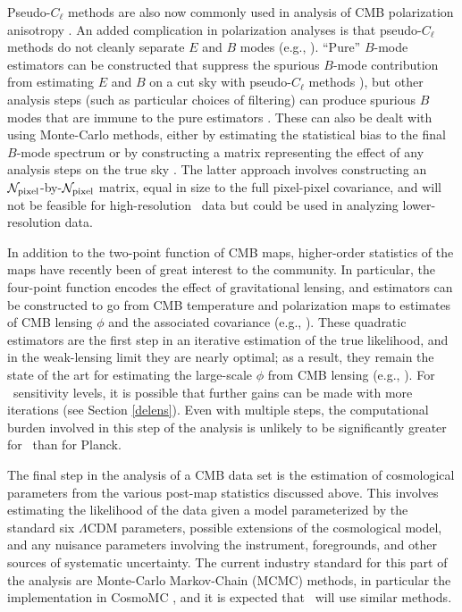 Pseudo-$C_\ell$ methods are also now commonly used in analysis of CMB polarization anisotropy
\cite{Aghanim:2015xee,Naess:2014wtr,Crites:2014prc}. An added complication in polarization analyses is that 
pseudo-$C_\ell$ methods do not cleanly separate $E$ and $B$ modes (e.g., \cite{Challinor:2005jy}).
``Pure'' $B$-mode estimators can be constructed that suppress the spurious $B$-mode contribution
from estimating $E$ and $B$ on a cut sky with pseudo-$C_\ell$ methods \cite{Smith:2005gi}), but 
other analysis steps (such as particular choices of filtering) can produce spurious $B$ modes that
are immune to the pure estimators \cite{Keisler:2015hfa}. These can also be dealt with using Monte-Carlo
methods, either by estimating the statistical bias to the final $B$-mode spectrum or by constructing
a matrix representing the effect of any analysis steps on the true sky \cite{Ade:2014xna}. The latter
approach involves constructing an ${\cal N}_\mathrm{pixel}$-by-${\cal N}_\mathrm{pixel}$ matrix, equal in size to the 
full pixel-pixel covariance, and will not be feasible for high-resolution \cmbexp\ data but could be 
used in analyzing lower-resolution data.

In addition to the two-point function of CMB maps, higher-order statistics of the maps have recently 
been of great interest to the community. In particular, the four-point function encodes the effect of 
gravitational lensing, and estimators can be constructed to go from CMB temperature and polarization
maps to estimates of CMB lensing $\phi$ and the associated covariance (e.g., \cite{Hu:2001kj,Okamoto:2003zw}).
These quadratic estimators are the first step in an iterative estimation of the true likelihood, and in
the weak-lensing limit they are nearly optimal; as a result, they remain the state of the art for estimating
the large-scale $\phi$ from CMB lensing (e.g., \cite{Ade:2013lta}). For \cmbexp\ sensitivity levels, 
it is possible that further gains can be made with more iterations (see Section \ref{delens}).
Even with multiple steps, the computational burden involved
in this step of the analysis is unlikely to be significantly greater for \cmbexp\ than for Planck.

The final step in the analysis of a CMB data set is the estimation of cosmological parameters from
the various post-map statistics discussed above.
This involves estimating the likelihood of the data
given a model parameterized by the standard six $\Lambda$CDM parameters, possible extensions
of the cosmological model, and any nuisance parameters involving the instrument, foregrounds, and
other sources of systematic uncertainty. The current industry standard for this part of the analysis are
Monte-Carlo Markov-Chain (MCMC) methods, in particular the implementation in CosmoMC
\cite{Lewis:2002ah}, and it is expected that \cmbexp\ will use similar methods. 

